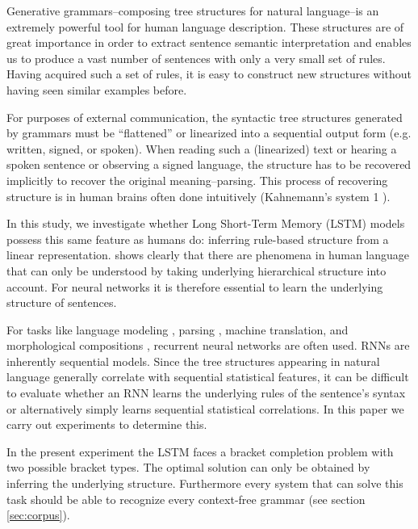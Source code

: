 \documentclass[11pt,a4paper]{article}
\begin{document}
Generative grammars--composing tree structures for natural language--is an extremely powerful tool for human language description.  These structures are of great importance in order to extract sentence semantic interpretation\cite{berwick2016only} and enables us to produce a vast number of sentences with only a very small set of rules. Having acquired such a set of rules, it is easy to construct new structures without having seen similar examples before.

For purposes of external communication, the syntactic tree structures generated by grammars must be ``flattened'' or linearized into a sequential output form (e.g. written, signed, or spoken). When reading such a (linearized) text or hearing a spoken sentence or observing a signed language, the structure has to be recovered implicitly to recover the original meaning--parsing.
This process of recovering structure is in human brains often done intuitively (Kahnemann's system 1 \cite{kahneman2011thinking}).

In this study, we investigate whether Long Short-Term Memory (LSTM) models \cite{hochreiter1997long} possess this same feature as humans do: inferring rule-based structure from a linear representation. \citeauthor{everaert2015structures}  shows clearly that there are phenomena in human language that can only be understood by taking underlying hierarchical structure into account. For neural networks it is therefore essential to learn the underlying structure of sentences.

For tasks like language modeling \cite{mikolov2010recurrent, sundermeyer2012lstm}, parsing \cite{vinyals2015grammar, kiperwasser2016simple, dyer2016recurrent}, machine translation, \cite{bahdanau2014neural} and morphological compositions \cite{kim2016character}, recurrent neural networks are often used. RNNs are inherently sequential models. Since the tree structures appearing in natural language generally correlate with sequential statistical features, it can be difficult to evaluate whether an RNN learns the underlying rules of the sentence's syntax or alternatively simply learns sequential statistical correlations.  In this paper we carry out experiments to determine this.

In the present experiment the LSTM faces a bracket completion problem with two possible bracket types. The optimal solution can only be obtained by inferring the underlying structure. Furthermore every system that can solve this task should be able to recognize every context-free grammar (see section \ref{sec:corpus}).
\end{document}

